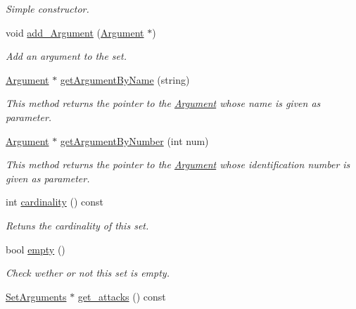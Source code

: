 \begin{DoxyCompactItemize}
\begin{DoxyCompactList}\small\item\em Simple constructor. \end{DoxyCompactList}\item 
void \hyperlink{classSetArguments_a989d8986ecf49baa0dc982766c0a5df4}{add\-\_\-\-Argument} (\hyperlink{classArgument}{Argument} $\ast$)
\begin{DoxyCompactList}\small\item\em Add an argument to the set. \end{DoxyCompactList}\item 
\hyperlink{classArgument}{Argument} $\ast$ \hyperlink{classSetArguments_ab4ddcd0942b0fa06de4ab9726e12edef}{get\-Argument\-By\-Name} (string)
\begin{DoxyCompactList}\small\item\em This method returns the pointer to the \hyperlink{classArgument}{Argument} whose name is given as parameter. \end{DoxyCompactList}\item 
\hyperlink{classArgument}{Argument} $\ast$ \hyperlink{classSetArguments_a119cb47c6e77b8faf10135d90c5b68b9}{get\-Argument\-By\-Number} (int num)
\begin{DoxyCompactList}\small\item\em This method returns the pointer to the \hyperlink{classArgument}{Argument} whose identification number is given as parameter. \end{DoxyCompactList}\item 
int \hyperlink{classSetArguments_a66d5b1cc6b684700c2394a8cf62ef7f0}{cardinality} () const 
\begin{DoxyCompactList}\small\item\em Retuns the cardinality of this set. \end{DoxyCompactList}\item 
bool \hyperlink{classSetArguments_a91e548daa6d0859946c8604b1ebb8c5a}{empty} ()
\begin{DoxyCompactList}\small\item\em Check wether or not this set is empty. \end{DoxyCompactList}\item 
\hypertarget{classSetArguments_a55ce09615ed88aee975e10569ddfcd75}{\hyperlink{classSetArguments}{Set\-Arguments} $\ast$ \hyperlink{classSetArguments_a55ce09615ed88aee975e10569ddfcd75}{get\-\_\-attacks} () const }\label{classSetArguments_a55ce09615ed88aee975e10569ddfcd75}


\end{DoxyCompactItemize}
